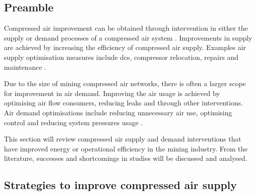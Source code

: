 	\subsection{Preamble}
		Compressed air improvement can be obtained through intervention in either the supply or demand processes of a compressed air system \cite{Kriel2014Masters}. Improvements in supply are achieved by increasing the efficiency of compressed air supply. Examples air supply optimisation measures include \gls{dcs}, compressor relocation, repairs and maintenance \cite{Snyman2011Masters}.
		\par
		Due to the size of mining compressed air networks, there is often a larger scope for improvement in air demand. Improving the air usage is achieved by optimising air flow consumers, reducing leaks and through other interventions. Air demand optimisations include reducing unnecessary air use, optimising control and reducing system pressures usage \cite{kleingeld2010high}.
		\par
	 	 This section will review compressed air supply and demand interventions that have improved energy or operational efficiency in the mining industry. From the literature, successes and shortcomings in studies will be discussed and analysed.
	 	
	\subsection{Strategies to improve compressed air supply}

